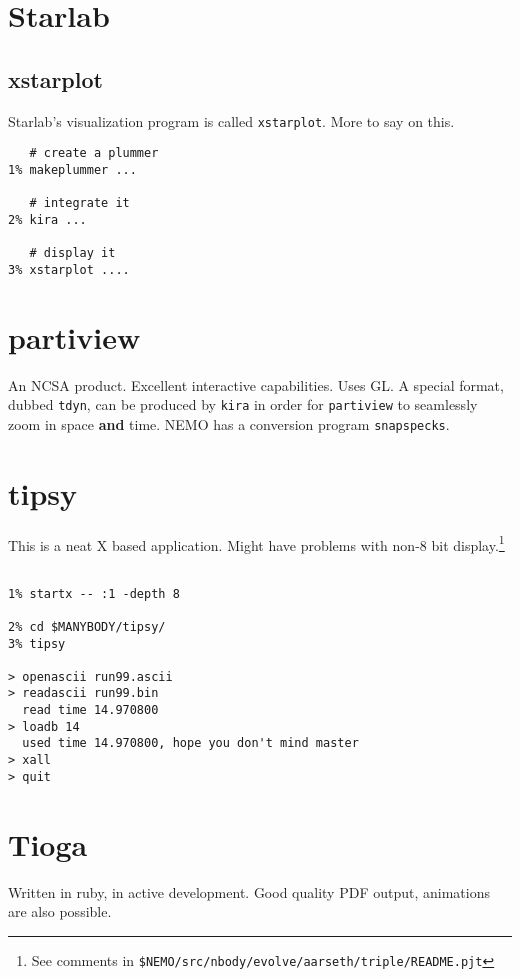 {\section{Starlab}
\subsection{xstarplot}

Starlab's visualization program is called {\tt xstarplot}. More to say on this.

\footnotesize\begin{verbatim}
   # create a plummer
1% makeplummer ...

   # integrate it
2% kira ...

   # display it
3% xstarplot ....
\end{verbatim}\normalsize

\section{partiview}

An NCSA product. Excellent interactive capabilities. Uses GL. A special
format, dubbed {\tt tdyn}, can be produced by {\tt kira} in order for
{\tt partiview} to seamlessly zoom in space {\bf and} time. NEMO has
a conversion program {\tt snapspecks}.

\section{tipsy}

This is a neat X based application. Might have problems with non-8 bit 
display.\footnote{See comments in {\tt \$NEMO/src/nbody/evolve/aarseth/triple/README.pjt}}

\footnotesize\begin{verbatim}

1% startx -- :1 -depth 8

2% cd $MANYBODY/tipsy/
3% tipsy

> openascii run99.ascii
> readascii run99.bin
  read time 14.970800
> loadb 14
  used time 14.970800, hope you don't mind master
> xall
> quit
\end{verbatim}\normalsize



\section{Tioga}

Written in ruby, in active development. Good quality PDF output, animations are also possible.

}

